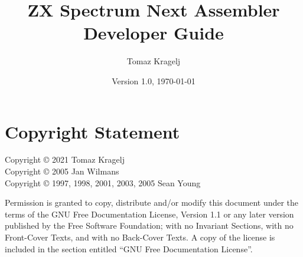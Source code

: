 \documentclass[12pt,twoside,openright,a4paper]{book}
\begin{document}
\frontmatter




\title{ZX Spectrum Next Assembler Developer Guide}
\author{Tomaz Kragelj}
\date{Version 1.0, \today}

\maketitle


\chapter*{Copyright Statement}

Copyright {\copyright} 2021 Tomaz Kragelj\\
Copyright {\copyright} 2005 Jan Wilmans\\
Copyright {\copyright} 1997, 1998, 2001, 2003, 2005 Sean Young

Permission is granted to copy, distribute and/or modify this document under the terms of the GNU Free Documentation License, Version 1.1 or any later version published by the Free Software Foundation; with no Invariant Sections, with no Front-Cover Texts, and with no Back-Cover Texts. A copy of the license is included in the section entitled ``GNU Free Documentation License''.
\end{document}
